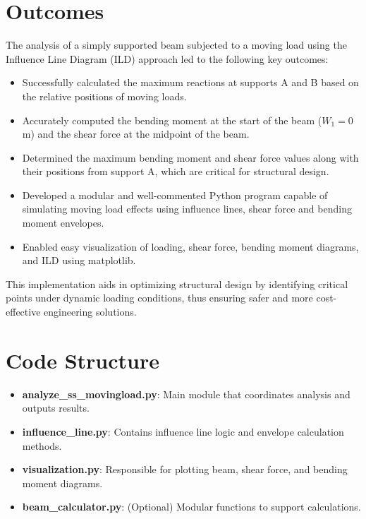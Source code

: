 \documentclass[12pt,a4paper]{article}
\begin{document}
\section{Outcomes}

The analysis of a simply supported beam subjected to a moving load using the Influence Line Diagram (ILD) approach led to the following key outcomes:

\begin{itemize}
    \item Successfully calculated the maximum reactions at supports A and B based on the relative positions of moving loads.
    \item Accurately computed the bending moment at the start of the beam ($W_1 = 0$ m) and the shear force at the midpoint of the beam.
    \item Determined the maximum bending moment and shear force values along with their positions from support A, which are critical for structural design.
    \item Developed a modular and well-commented Python program capable of simulating moving load effects using influence lines, shear force and bending moment envelopes.
    \item Enabled easy visualization of loading, shear force, bending moment diagrams, and ILD using matplotlib.
\end{itemize}

This implementation aids in optimizing structural design by identifying critical points under dynamic loading conditions, thus ensuring safer and more cost-effective engineering solutions.


\section*{Code Structure}
\begin{itemize}
    \item \textbf{analyze\_ss\_movingload.py}: Main module that coordinates analysis and outputs results.
    \item \textbf{influence\_line.py}: Contains influence line logic and envelope calculation methods.
    \item \textbf{visualization.py}: Responsible for plotting beam, shear force, and bending moment diagrams.
    \item \textbf{beam\_calculator.py}: (Optional) Modular functions to support calculations.
\end{itemize}
\end{document}
